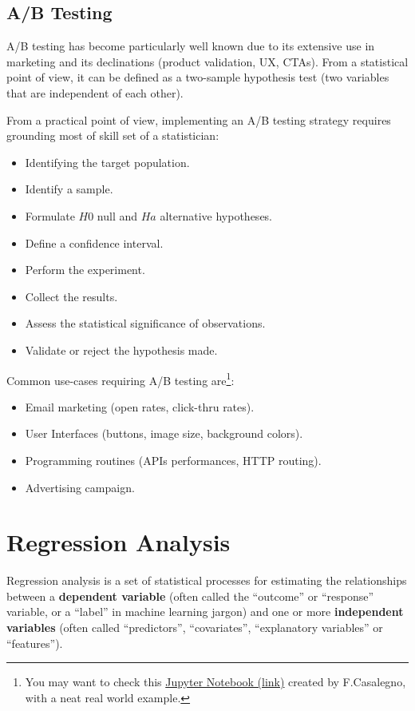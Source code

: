 \documentclass{article}
\begin{document}
\subsection{A/B Testing}
A/B testing has become particularly well known due to its extensive use in marketing and its declinations (product validation, UX, CTAs).
From a statistical point of view, it can be defined as a two-sample hypothesis test (two variables that are independent of each other). 

From a practical point of view, implementing an A/B testing strategy requires grounding most of skill set of a statistician:
\begin{itemize}
    \item Identifying the target population.
    \item Identify a sample.
    \item Formulate $H0$ null and $Ha$ alternative hypotheses.
    \item Define a confidence interval. 
    \item Perform the experiment.
    \item Collect the results.
    \item Assess the statistical significance of observations.
    \item Validate or reject the hypothesis made.
\end{itemize}

Common use-cases requiring A/B testing are\footnote{You may want to check this \href{https://github.com/FrancescoCasalegno/AB-Testing/blob/main/AB_Testing.ipynb}{Jupyter Notebook (link)} created by F.Casalegno, with a neat real world example.}:
\begin{itemize}
    \item Email marketing (open rates, click-thru rates).
    \item User Interfaces (buttons, image size, background colors).
    \item Programming routines (APIs performances, HTTP routing).
    \item Advertising campaign.
\end{itemize}

\clearpage

\section{Regression Analysis}
Regression analysis is a set of statistical processes for estimating the relationships between a \textbf{dependent variable} (often called the “outcome” or “response” variable, or a “label” in machine learning jargon) and one or more \textbf{independent variables} (often called “predictors”, “covariates”, “explanatory variables” or “features”).
\end{document}
